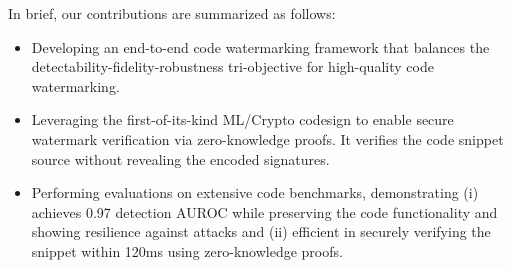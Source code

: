 In brief, our contributions are summarized as follows:

\begin{itemize}
    \item Developing an end-to-end code watermarking framework that balances the detectability-fidelity-robustness tri-objective for high-quality code watermarking. 

    \item Leveraging the first-of-its-kind ML/Crypto codesign to enable secure watermark verification via zero-knowledge proofs. It verifies the code snippet source without revealing the encoded signatures. 
    
    \item Performing evaluations on extensive code benchmarks, demonstrating \sys{} (i) achieves  0.97 detection AUROC while preserving the code functionality and showing resilience against attacks and (ii) efficient in securely verifying the snippet within 120ms using zero-knowledge proofs.
\end{itemize}
